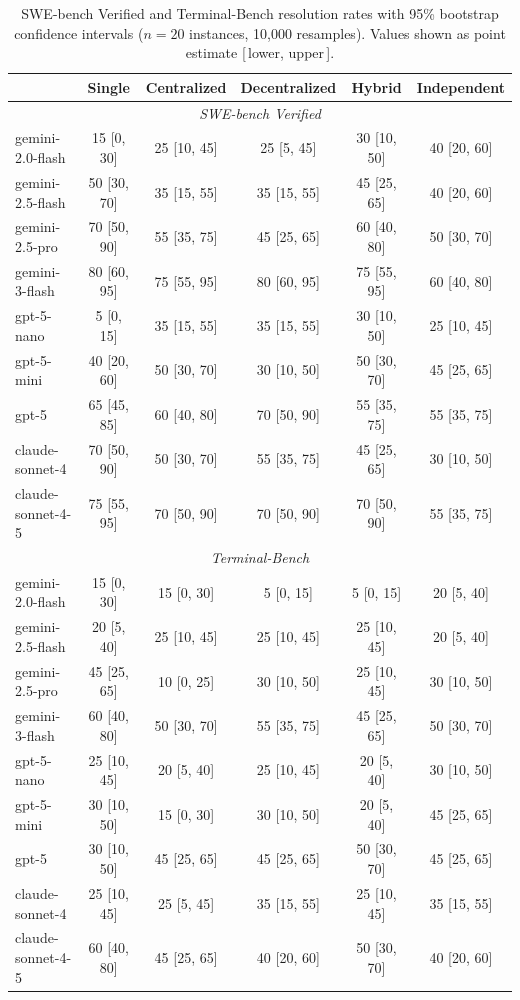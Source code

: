 \begin{table}[h]
\centering
\small
\caption{SWE-bench Verified and Terminal-Bench resolution rates with 95\% bootstrap confidence intervals ($n=20$ instances, 10,000 resamples). Values shown as point estimate [\,lower, upper\,].}
\begin{tabular}{l|ccccc}
\toprule
& \textbf{Single} & \textbf{Centralized} & \textbf{Decentralized} & \textbf{Hybrid} & \textbf{Independent} \\
\midrule
\multicolumn{6}{c}{\textit{SWE-bench Verified}} \\
\midrule
gemini-2.0-flash & 15 [0, 30] & 25 [10, 45] & 25 [5, 45] & 30 [10, 50] & 40 [20, 60] \\
gemini-2.5-flash & 50 [30, 70] & 35 [15, 55] & 35 [15, 55] & 45 [25, 65] & 40 [20, 60] \\
gemini-2.5-pro & 70 [50, 90] & 55 [35, 75] & 45 [25, 65] & 60 [40, 80] & 50 [30, 70] \\
gemini-3-flash & 80 [60, 95] & 75 [55, 95] & 80 [60, 95] & 75 [55, 95] & 60 [40, 80] \\
gpt-5-nano & 5 [0, 15] & 35 [15, 55] & 35 [15, 55] & 30 [10, 50] & 25 [10, 45] \\
gpt-5-mini & 40 [20, 60] & 50 [30, 70] & 30 [10, 50] & 50 [30, 70] & 45 [25, 65] \\
gpt-5 & 65 [45, 85] & 60 [40, 80] & 70 [50, 90] & 55 [35, 75] & 55 [35, 75] \\
claude-sonnet-4 & 70 [50, 90] & 50 [30, 70] & 55 [35, 75] & 45 [25, 65] & 30 [10, 50] \\
claude-sonnet-4-5 & 75 [55, 95] & 70 [50, 90] & 70 [50, 90] & 70 [50, 90] & 55 [35, 75] \\
\midrule
\multicolumn{6}{c}{\textit{Terminal-Bench}} \\
\midrule
gemini-2.0-flash & 15 [0, 30] & 15 [0, 30] & 5 [0, 15] & 5 [0, 15] & 20 [5, 40] \\
gemini-2.5-flash & 20 [5, 40] & 25 [10, 45] & 25 [10, 45] & 25 [10, 45] & 20 [5, 40] \\
gemini-2.5-pro & 45 [25, 65] & 10 [0, 25] & 30 [10, 50] & 25 [10, 45] & 30 [10, 50] \\
gemini-3-flash & 60 [40, 80] & 50 [30, 70] & 55 [35, 75] & 45 [25, 65] & 50 [30, 70] \\
gpt-5-nano & 25 [10, 45] & 20 [5, 40] & 25 [10, 45] & 20 [5, 40] & 30 [10, 50] \\
gpt-5-mini & 30 [10, 50] & 15 [0, 30] & 30 [10, 50] & 20 [5, 40] & 45 [25, 65] \\
gpt-5 & 30 [10, 50] & 45 [25, 65] & 45 [25, 65] & 50 [30, 70] & 45 [25, 65] \\
claude-sonnet-4 & 25 [10, 45] & 25 [5, 45] & 35 [15, 55] & 25 [10, 45] & 35 [15, 55] \\
claude-sonnet-4-5 & 60 [40, 80] & 45 [25, 65] & 40 [20, 60] & 50 [30, 70] & 40 [20, 60] \\
\bottomrule
\end{tabular}
\label{tab:s6_bootstrap}
\end{table}
